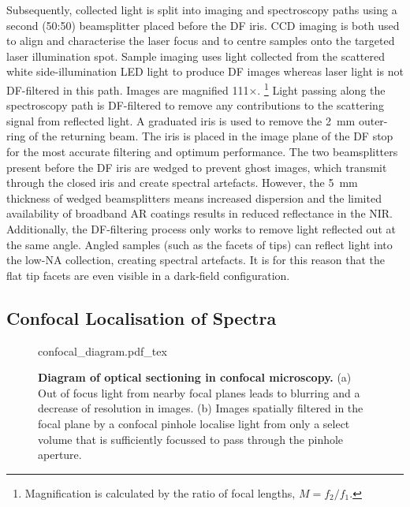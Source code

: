 \documentclass{article}
\begin{document}
Subsequently, collected light is split into imaging and spectroscopy paths using a second (50:50) beamsplitter placed before the DF iris. CCD imaging is both used to align and characterise the laser focus and to centre samples onto the targeted laser illumination spot. Sample imaging uses light collected from the scattered white side-illumination LED light to produce DF images whereas laser light is not DF-filtered in this path. Images are magnified 111$\times$.%
\footnote{Magnification is calculated by the ratio of focal lengths, $M=f_2/f_1$.}
Light passing along the spectroscopy path is DF-filtered to remove any contributions to the scattering signal from reflected light. A graduated iris is used to remove the \SI{2}{mm} outer-ring of the returning beam. The iris is placed in the image plane of the DF stop for the most accurate filtering and optimum performance. The two beamsplitters present before the DF iris are wedged to prevent ghost images, which transmit through the closed iris and create spectral artefacts. However, the \SI{5}{mm} thickness of wedged beamsplitters means increased dispersion and the limited availability of broadband AR coatings results in reduced reflectance in the NIR. %
Additionally, the DF-filtering process only works to remove light reflected out at the same angle. Angled samples (such as the facets of tips) can reflect light into the low-NA collection, creating spectral artefacts. It is for this reason that the flat tip facets are even visible in a dark-field configuration.

\subsection{Confocal Localisation of Spectra}

\begin{figure}[bt]
\centering
\fontsize{10pt}{1em}\selectfont
{confocal_diagram.pdf_tex}
\caption[Diagram of optical sectioning in confocal microscopy]{\textbf{Diagram of optical sectioning in confocal microscopy.} (a) Out of focus light from nearby focal planes leads to blurring and a decrease of resolution in images. (b) Images spatially filtered in the focal plane by a confocal pinhole localise light from only a select volume that is sufficiently focussed to pass through the pinhole aperture.}
\label{fig:confocal_diagram}
\end{figure}
\end{document}
